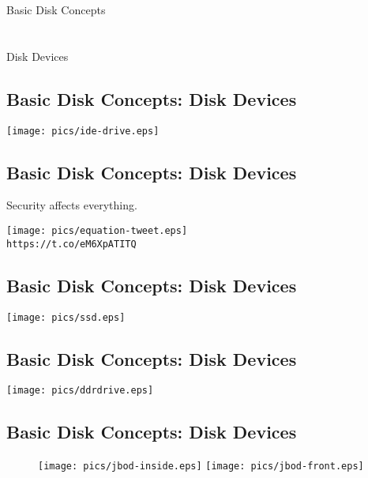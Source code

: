 \documentclass[xga]{xdvislides}
\begin{document}
\newpage
\vspace*{\fill}
\begin{center}
	\Hugesize
		Basic Disk Concepts \\ [1em]
	\hspace*{5mm}
	\blueline\\
	\hspace*{5mm}\\
		Disk Devices
\end{center}
\vspace*{\fill}


\subsection{Basic Disk Concepts: Disk Devices}
	\begin{center}
		\texttt{[image: pics/ide-drive.eps]} \\
	\end{center}

\subsection{Basic Disk Concepts: Disk Devices}
Security affects everything. \\
\begin{center}
	\texttt{[image: pics/equation-tweet.eps]} \\
	\verb+https://t.co/eM6XpATITQ+
\end{center}

\subsection{Basic Disk Concepts: Disk Devices}
	\begin{center}
		\texttt{[image: pics/ssd.eps]} \\
	\end{center}

\subsection{Basic Disk Concepts: Disk Devices}
	\begin{center}
		\texttt{[image: pics/ddrdrive.eps]} \\
	\end{center}

\subsection{Basic Disk Concepts: Disk Devices}
\begin{figure}[hb]
	\begin{center}
		\texttt{[image: pics/jbod-inside.eps]}
		\hspace*{15mm}
		\texttt{[image: pics/jbod-front.eps]} \\
	\end{center}
\end{figure}
\end{document}
